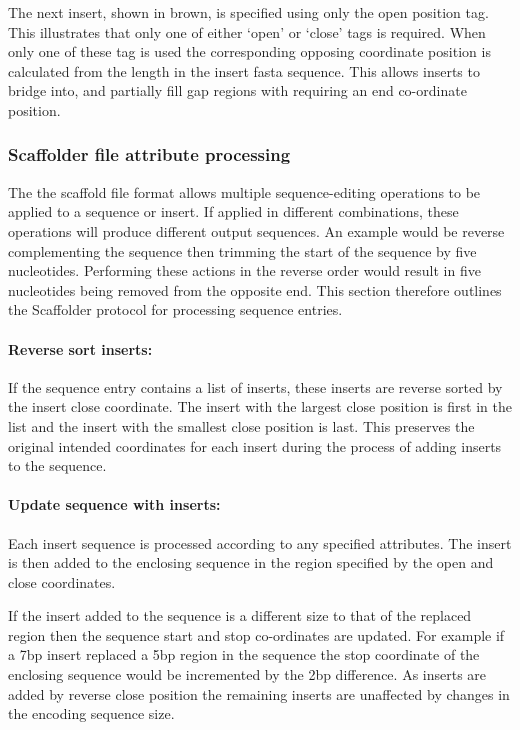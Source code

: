 \documentclass[10pt]{bmc_article}
\newenvironment{bmcformat}{\begin{raggedright}\baselineskip20pt\sloppy\setboolean{publ}{false}}{\end{raggedright}\baselineskip20pt\sloppy}
\begin{document}
\begin{bmcformat}
The next insert, shown in brown, is specified using only the open position tag.
This illustrates that only one of either `open' or `close' tags is required.
When only one of these tag is used the corresponding opposing coordinate
position is calculated from the length in the insert fasta sequence. This
allows inserts to bridge into, and partially fill gap regions with requiring an
end co-ordinate position. \pb

\subsubsection*{Scaffolder file attribute processing} %

The the scaffold file format allows multiple sequence-editing operations to be
applied to a sequence or insert. If applied in different combinations, these
operations will produce different output sequences. An example would be reverse
complementing the sequence then trimming the start of the sequence by five
nucleotides. Performing these actions in the reverse order would result in five
nucleotides being removed from the opposite end. This section therefore
outlines the Scaffolder protocol for processing sequence entries. \pb

\paragraph{Reverse sort inserts:} If the sequence entry contains a list of
inserts, these inserts are reverse sorted by the insert close coordinate. The
insert with the largest close position is first in the list and the insert
with the smallest close position is last. This preserves the original intended
coordinates for each insert during the process of adding inserts to the
sequence. \pb

\paragraph{Update sequence with inserts:} Each insert sequence is processed
according to any specified attributes. The insert is then added to the
enclosing sequence in the region specified by the open and close coordinates.
\pb

If the insert added to the sequence is a different size to that of the
replaced region then the sequence start and stop co-ordinates are updated. For
example if a 7bp insert replaced a 5bp region in the sequence the stop
coordinate of the enclosing sequence would be incremented by the 2bp
difference. As inserts are added by reverse close position the remaining
inserts are unaffected by changes in the encoding sequence size. \pb


\end{bmcformat}
\end{document}

